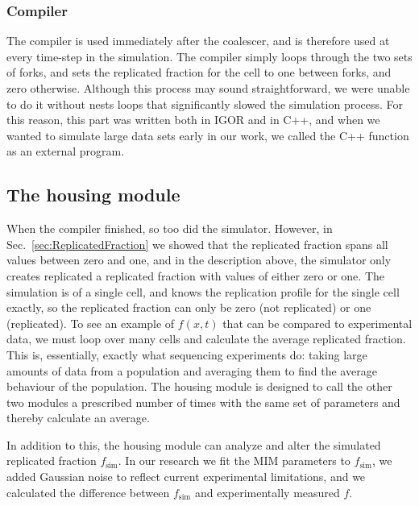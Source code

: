 			
			\subsubsection{Compiler}
			
			The compiler is used immediately after the coalescer, and is therefore used at every time-step in the simulation.
			The compiler simply loops through the two sets of forks, and sets the replicated fraction for the cell to one between forks, and zero otherwise.
			Although this process may sound straightforward, we were unable to do it without nests loops that significantly slowed the simulation process.
			For this reason, this part was written both in IGOR and in C++, and when we wanted to simulate large data sets early in our work, we called the C++ function as an external program.
			
		
		\subsection{The housing module}
		
		When the compiler finished, so too did the simulator.
		However, in Sec.~\ref{sec:ReplicatedFraction} we showed that the replicated fraction spans all values between zero and one, and in the description above, the simulator only creates replicated a replicated fraction with values of either zero or one.
		The simulation is of a single cell, and knows the replication profile for the single cell exactly, so the replicated fraction can only be zero (not replicated) or one (replicated).
		To see an example of $f(x,t)$ that can be compared to experimental data, we must loop over many cells and calculate the average replicated fraction.
		This is, essentially, exactly what sequencing experiments do: taking large amounts of data from a population and averaging them to find the average behaviour of the population.
		The housing module is designed to call the other two modules a prescribed number of times with the same set of parameters and thereby calculate an average.
		
		In addition to this, the housing module can analyze and alter the simulated replicated fraction $f_\text{sim}$.
		In our research we fit the MIM parameters to $f_\text{sim}$, we added Gaussian noise to reflect current experimental limitations, and we calculated the difference between $f_\text{sim}$ and experimentally measured $f$.











































